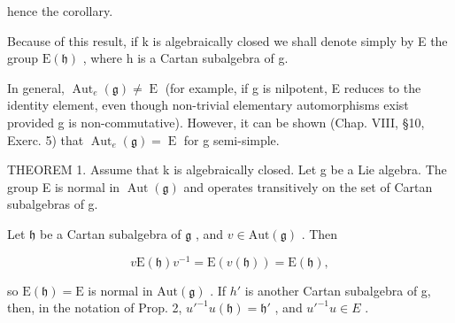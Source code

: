 hence the corollary.

Because of this result, if k is algebraically closed we shall denote simply by E the group \(\mathrm{E}(\mathfrak{h})\) , where h is a Cartan subalgebra of g.

In general, \(\operatorname{Aut}_{e}(\mathfrak{g}) \neq \operatorname{E}\) (for example, if g is nilpotent, E reduces to the identity element, even though non-trivial elementary automorphisms exist provided g is non-commutative). However, it can be shown (Chap. VIII, §10, Exerc. 5) that \(\operatorname{Aut}_{e}(\mathfrak{g}) = \operatorname{E}\) for g semi-simple.

THEOREM 1. Assume that k is algebraically closed. Let g be a Lie algebra. The group E is normal in \(\operatorname{Aut}(\mathfrak{g})\) and operates transitively on the set of Cartan subalgebras of g.

Let \(\mathfrak{h}\) be a Cartan subalgebra of \(\mathfrak{g}\) , and \(v\in\mathrm{Aut}(\mathfrak{g})\) . Then

\[
v \mathrm{E} (\mathfrak {h}) v ^ {- 1} = \mathrm{E} (v (\mathfrak {h})) = \mathrm{E} (\mathfrak {h}),
\]

so \(\mathrm{E}(\mathfrak{h}) = \mathrm{E}\) is normal in \(\mathrm{Aut}(\mathfrak{g})\) . If \(h'\) is another Cartan subalgebra of g, then, in the notation of Prop. 2, \(u'^{-1}u(\mathfrak{h}) = \mathfrak{h}'\) , and \(u'^{-1}u \in E\) .

